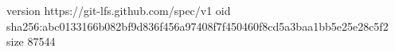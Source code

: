 version https://git-lfs.github.com/spec/v1
oid sha256:abc0133166b082bf9d836f456a97408f7f450460f8cd5a3baa1bb5e25e28c5f2
size 87544
